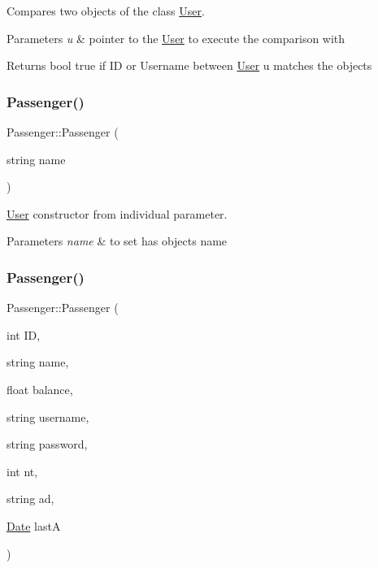 Compares two objects of the class \hyperlink{class_user}{User}. 


\begin{DoxyParams}{Parameters}
{\em u} & pointer to the \hyperlink{class_user}{User} to execute the comparison with\\
\hline
\end{DoxyParams}
\begin{DoxyReturn}{Returns}
bool true if ID or Username between \hyperlink{class_user}{User} u matches the object\textquotesingle{}s 
\end{DoxyReturn}
\mbox{\label{group___user_ga00628e580d270e68278cc76994c841b1}} 
\subsubsection{\texorpdfstring{Passenger()}{Passenger()}\hspace{0.1cm}{\footnotesize\ttfamily [1/2]}}
{\footnotesize\ttfamily Passenger\+::\+Passenger (\begin{DoxyParamCaption}\item[{string}]{name }\end{DoxyParamCaption})}



\hyperlink{class_user}{User} constructor from individual parameter. 


\begin{DoxyParams}{Parameters}
{\em name} & to set has object\textquotesingle{}s name \\
\hline
\end{DoxyParams}
\mbox{\label{group___user_ga0c1aecc465a9e8887f2b9bd3e784438a}} 
\subsubsection{\texorpdfstring{Passenger()}{Passenger()}\hspace{0.1cm}{\footnotesize\ttfamily [2/2]}}
{\footnotesize\ttfamily Passenger\+::\+Passenger (\begin{DoxyParamCaption}\item[{int}]{ID,  }\item[{string}]{name,  }\item[{float}]{balance,  }\item[{string}]{username,  }\item[{string}]{password,  }\item[{int}]{nt,  }\item[{string}]{ad,  }\item[{\hyperlink{class_date}{Date}}]{lastA }\end{DoxyParamCaption})}



